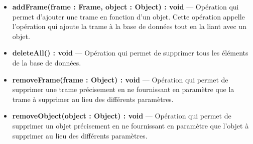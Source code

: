 \begin{itemize}
    \item \textbf{addFrame(frame : Frame, object : Object) : void } --- Opération qui permet d'ajouter une trame en fonction d'un objet. Cette opération appelle l'opération qui ajoute la trame à la base de données tout en la liant avec un objet. 
    \item \textbf{deleteAll() : void } --- Opération qui permet de supprimer tous les éléments de la base de données. 
    \item \textbf{removeFrame(frame : Object) : void } --- Opération qui permet de supprimer une trame précisement en ne fournissant en paramètre que la trame à supprimer au lieu des différents paramètres. 
    \item \textbf{removeObject(object : Object) : void } --- Opération qui permet de supprimer un objet précisement en ne fournissant en paramètre que l'objet à supprimer au lieu des différents paramètres.  
\end{itemize}

